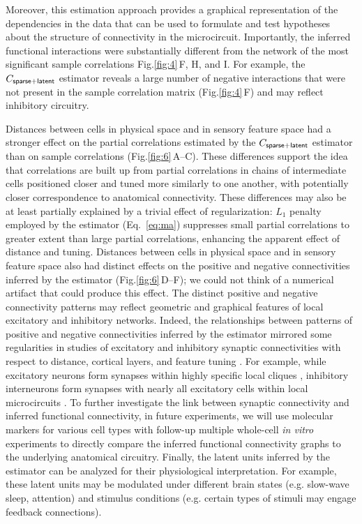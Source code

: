 \documentclass[10pt]{article}
\newcommand{\figref}[2]{Fig.\;\ref{fig:#1}\,#2}
\begin{document}
Moreover, this estimation approach provides a graphical representation of the dependencies in the data that can be used to formulate and test hypotheses about the structure of connectivity in the microcircuit. Importantly, the inferred functional interactions were substantially different from the network of the most significant sample correlations \figref{4}{F, H, and I}.  For example, the $C_{\sf sparse+latent}$ estimator reveals a large number of negative interactions that were not present in the sample correlation matrix (\figref{4}{F}) and may reflect inhibitory circuitry. 

Distances between cells in physical space and in sensory feature space had a stronger effect on the partial correlations estimated by the $C_{\sf sparse+latent}$ estimator than on sample correlations (\figref{6}{A--C}). 
These differences support the idea that correlations are built up from partial correlations in chains of intermediate cells positioned closer and tuned more similarly to one another, with potentially closer correspondence to anatomical connectivity.  These differences may also be at least partially explained by a trivial effect of regularization: $L_1$ penalty employed by the estimator (Eq.~\ref{eq:ma}) suppresses small partial correlations to greater extent than large partial correlations, enhancing the apparent effect of distance and tuning.  Distances between cells in physical space and in sensory feature space also had distinct effects on the positive and negative connectivities inferred by the estimator (\figref{6}{D--F}); we could not think of a numerical artifact that could produce this effect. The distinct positive and negative connectivity patterns  may reflect geometric and graphical features of local excitatory and inhibitory networks. Indeed, the relationships between patterns of positive and negative connectivities inferred by the estimator mirrored some regularities in studies of excitatory and inhibitory synaptic connectivities with respect to distance, cortical layers, and feature tuning \cite{Song:2005, Oswald:2008, Adesnik:2010, Perin:2011, Fino:2011, Hofer:2011, Isaacson:2011, Levy:2012}. For example, while excitatory neurons form synapses within highly specific local cliques \cite{Perin:2011}, inhibitory interneurons form synapses with nearly all excitatory cells within local microcircuits \cite{Fino:2011, Hofer:2011, Packer:2011}.  To further investigate the link between synaptic connectivity and inferred functional connectivity, in future experiments, we will use molecular markers for various cell types with follow-up multiple whole-cell \emph{in vitro} experiments \cite{Hofer:2011, Ko:2013} to directly compare the inferred functional connectivity graphs to the underlying anatomical circuitry. Finally, the latent units inferred by the estimator can be analyzed for their physiological interpretation. For example, these latent units may be modulated under different brain states (e.g. slow-wave sleep, attention) and stimulus conditions (e.g. certain types of stimuli may engage feedback connections). 
\end{document}
